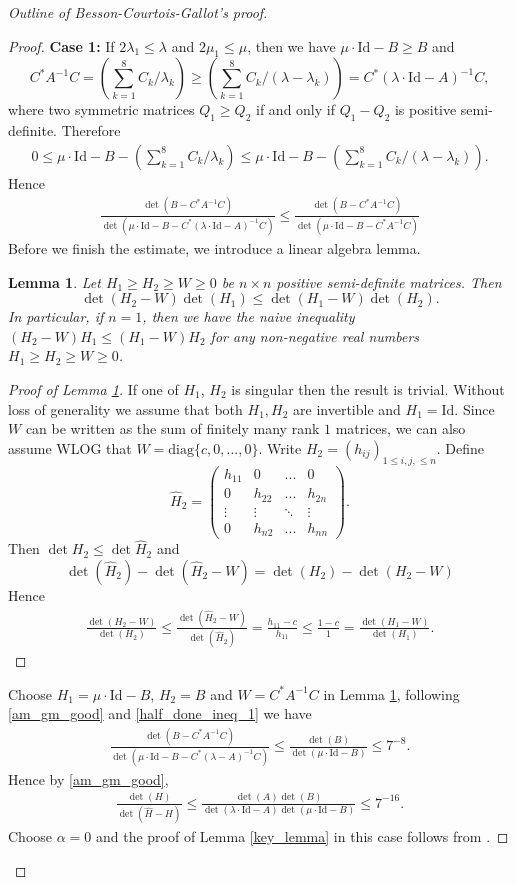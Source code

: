 \documentclass{article}
\newcommand{\id}{\mathrm{Id}}
\newcommand{\mativ}[4]{\left(\begin{array}{cccc} #1\\#2\\#3\\#4\end{array}\right)}
\newtheorem{lem}[thm]{Lemma}
\theoremstyle{definition}
\begin{document}
\begin{proof}[Outline of Besson-Courtois-Gallot's proof]
\begin{proof}
\textbf{Case 1:} If $2\lambda_1\leq\lambda$ and $2\mu_1\leq \mu$, then  we have $\mu\cdot\id - B\geq B$ and 
$$C^*A^{-1}C=\left(\sum_{k=1}^8C_k/\lambda_k\right)\geq\left(\sum_{k=1}^8C_k/(\lambda-\lambda_k)\right)=C^*(\lambda\cdot\id-A)^{-1}C,$$
where two symmetric matrices $Q_1\geq Q_2$ if and only if $Q_1-Q_2$ is positive semi-definite. Therefore
\begin{align}\label{*}0\leq \mu\cdot\id-B-\left(\sum_{k=1}^8C_k/\lambda_k\right)\leq\mu\cdot\id-B-\left(\sum_{k=1}^8C_k/(\lambda-\lambda_k)\right).\end{align}
Hence
\begin{align}\label{half_done_ineq_1}
\frac{\det(B-C^*A^{-1}C)}{\det(\mu\cdot\id-B-C^*(\lambda\cdot\id-A)^{-1}C)} 
\leq\frac{\det(B-C^*A^{-1}C)}{\det(\mu\cdot\id-B-C^*A^{-1}C)}\iffalse\leq\frac{\det(B)}{\det(\mu\cdot\id-B)}\leq 7^{-8}\fi
\end{align}
Before we finish the estimate, we introduce a linear algebra lemma.
\begin{lem}\label{easy_lin_alg}
Let $H_1\geq H_2\geq W\geq 0$ be $n\times n$ positive semi-definite matrices. Then
$$\det(H_2-W)\det(H_1)\leq\det(H_1-W)\det(H_2).$$
In particular, if $n=1$, then we have the naive inequality $(H_2-W)H_1\leq(H_1-W)H_2$ for any non-negative real numbers $H_1\geq H_2\geq W\geq 0$.
\end{lem}
\begin{proof}[Proof of Lemma \ref{easy_lin_alg}]
If one of $H_1$, $H_2$ is singular then the result is trivial. Without loss of generality we assume that both $H_1,H_2$ are invertible and $H_1=\id$. Since $W$ can be written as the sum of finitely many rank $1$ matrices, we can also assume WLOG that $W=\mathrm{diag}\{c,0,...,0\}$. Write $H_2=(h_{ij})_{1\leq i,j,\leq n}$. Define 
$$\widehat{H}_2=\mativ{h_{11}&0&...&0}{0&h_{22}&...&h_{2n}}{\vdots&\vdots&\ddots&\vdots}{0&h_{n2}&...&h_{nn}}.$$
Then $\det{H_2}\leq\det{\widehat{H}_2}$ and 
$$\det(\widehat{H}_2)-\det(\widehat{H}_2-W)=\det(H_2)-\det(H_2-W)$$
Hence
\begin{align*}\frac{\det(H_2-W)}{\det(H_2)}\leq\frac{\det(\widehat{H}_2-W)}{\det(\widehat{H}_2)}=\frac{h_{11}-c}{h_{11}}\leq\frac{1-c}{1}=\frac{\det(H_1-W)}{\det(H_1)}.\tag*{\qedhere}\end{align*}
\end{proof}
Choose $H_1=\mu\cdot\id-B$, $H_2=B$ and $W=C^*A^{-1}C$ in Lemma \ref{easy_lin_alg}, following \eqref{am_gm_good} and \eqref{half_done_ineq_1} we have
\begin{align*}
\frac{\det(B-C^*A^{-1}C)}{\det(\mu\cdot\id-B-C^*(\lambda-A)^{-1}C)} \leq\frac{\det(B)}{\det(\mu\cdot\id-B)}\leq 7^{-8}.
\end{align*}
Hence by \eqref{am_gm_good},
\begin{align}\label{good_case}
\frac{\det(H)}{\det(\widehat{H}-H)}\leq\frac{\det(A)\det(B)}{\det(\lambda\cdot\id-A)\det(\mu\cdot\id-B)}\leq 7^{-16}.
\end{align}
Choose $\alpha=0$ and the proof of Lemma \ref{key_lemma} in this case follows from \cite[B.3-B.4 Lemmes]{BCG1}.


\end{proof}
\end{proof}
\end{document}
